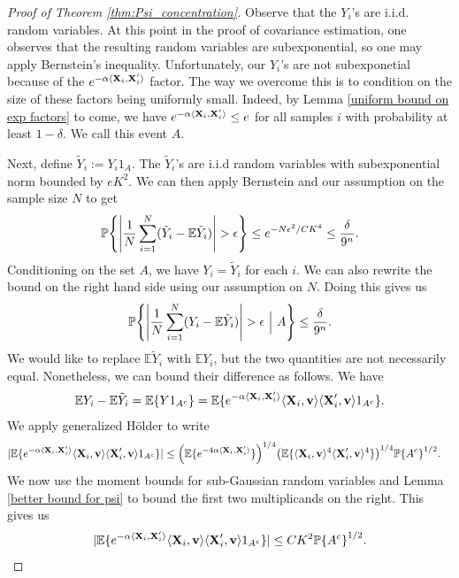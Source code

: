 \documentclass[final,12pt]{colt2018} %
\numberwithin{equation}{section}
\DeclarePairedDelimiter{\abs}{\lvert}{\rvert}
\DeclarePairedDelimiter{\paren}{(}{)}
\DeclarePairedDelimiter{\braces}{\lbrace}{\rbrace}
\DeclarePairedDelimiter{\inprod}{\langle}{\rangle}
\renewcommand{\P}{\mathbb{P}}
\newcommand{\E}{\mathbb{E}}
\newcommand{\boldv}{\textbf{v}}
\newcommand{\boldX}{\textbf{X}}
\begin{document}
\begin{proof}[Proof of Theorem \ref{thm:Psi_concentration}]
	Observe that the $Y_i$'s are i.i.d. random variables. At this point in the proof of covariance estimation, one observes that the resulting random variables are subexponential, so one may apply Bernstein's inequality. Unfortunately, our $Y_i$'s are not subexponetial because of the $e^{-\alpha\inprod{\boldX_i,\boldX_i'}}$ factor. The way we overcome this is to condition on the size of these factors being uniformly small. Indeed, by Lemma \ref{uniform bound on exp factors} to come, we have $e^{-\alpha\inprod{\boldX_i,\boldX_i'}} \leq e$ for all samples $i$ with probability at least $1- \delta$. We call this event $A$.
	
	Next, define $\tilde{Y}_i := Y_i1_A$. The $\tilde{Y}_i$'s are i.i.d random variables with subexponential norm bounded by $eK^2$. We can then apply Bernstein and our assumption on the sample size $N$ to get
	\begin{align}
	\P\braces*{\abs*{\frac{1}{N}\sum_{i=1}^N \paren{\tilde{Y}_i - \E \tilde{Y}_i}} > \epsilon} \leq e^{-N\epsilon^2/CK^4} \leq \frac{\delta}{9^n}.
	\end{align}
	Conditioning on the set $A$, we have $Y_i = \tilde{Y}_i$ for each $i$. We can also rewrite the bound on the right hand side using our assumption on $N$. Doing this gives us
	\begin{align} \label{intermediate Y deviation}
	\P\braces*{\abs*{\frac{1}{N}\sum_{i=1}^N \paren{Y_i - \E \tilde{Y}_i}} > \epsilon \ \Big| \ A} \leq \frac{\delta}{9^n}.
	\end{align}
	We would like to replace $\E \tilde{Y}_i$ with $\E Y_i$, but the two quantities are not necessarily equal. Nonetheless, we can bound their difference as follows. We have
	\begin{align}
	\E Y_i - \E\tilde{Y}_i = \E \braces{Y1_{A^c}} = \E\braces{e^{-\alpha\inprod{\boldX_i,\boldX_i'}}\inprod{\boldX_i,\boldv}\inprod{\boldX_i',\boldv}1_{A^c}}.
	\end{align}
	We apply generalized H{\"o}lder to write
	\begin{align}
	\abs{\E\braces{e^{-\alpha\inprod{\boldX_i,\boldX_i'}}\inprod{\boldX_i,\boldv}\inprod{\boldX_i',\boldv}1_{A^c}}} & \leq \paren*{\E \braces{e^{-4\alpha\inprod{\boldX_i,\boldX_i'}}}}^{1/4} \paren*{\E\braces{\inprod{\boldX_i,\boldv}^4\inprod{\boldX_i',\boldv}^4}}^{1/4}\P\braces*{A^c}^{1/2}.
	\end{align}
	We now use the moment bounds for sub-Gaussian random variables and Lemma \ref{better bound for psi} to bound the first two multiplicands on the right. This gives us
	\begin{align}
	\abs{\E\braces{e^{-\alpha\inprod{\boldX_i,\boldX_i'}}\inprod{\boldX_i,\boldv}\inprod{\boldX_i',\boldv}1_{A^c}}} \leq CK^2\P\braces*{A^c}^{1/2}.
	\end{align}
	

\end{proof}
\end{document}
